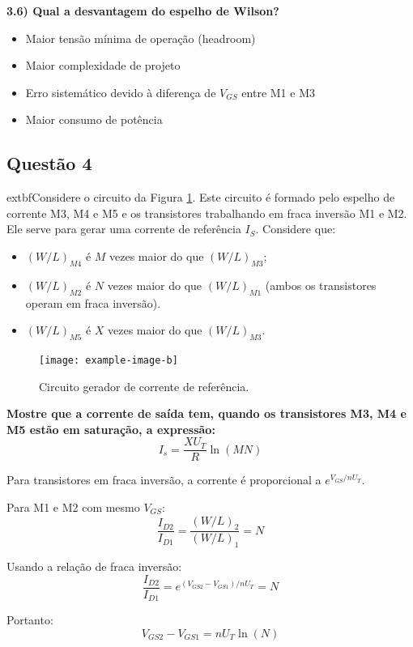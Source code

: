 ﻿\documentclass[12pt,a4paper]{article}
\begin{document}
\textbf{3.6) Qual a desvantagem do espelho de Wilson?}

\begin{itemize}
    \item Maior tensão mínima de operação (headroom)
    \item Maior complexidade de projeto
    \item Erro sistemático devido à diferença de $V_{GS}$ entre M1 e M3
    \item Maior consumo de potência
\end{itemize}

\subsection*{Questão 4}
    	extbf{Considere o circuito da Figura \ref{fig:gerador_corrente}. Este circuito é formado pelo espelho de corrente M3, M4 e M5 e os transistores trabalhando em fraca inversão M1 e M2. Ele serve para gerar uma corrente de referência $I_S$. Considere que:}
\begin{itemize}
    \item $(W/L)_{M4}$ é $M$ vezes maior do que $(W/L)_{M3}$;
    \item $(W/L)_{M2}$ é $N$ vezes maior do que $(W/L)_{M1}$ (ambos os transistores operam em fraca inversão).
    \item $(W/L)_{M5}$ é $X$ vezes maior do que $(W/L)_{M3}$.
\end{itemize}

\begin{figure}[H]
    \centering
    \texttt{[image: example-image-b]}
    \caption{Circuito gerador de corrente de referência.}
    \label{fig:gerador_corrente}
\end{figure}

\textbf{Mostre que a corrente de saída tem, quando os transistores M3, M4 e M5 estão em saturação, a expressão:}
$$I_s = \frac{XU_T}{R} \ln(MN)$$



Para transistores em fraca inversão, a corrente é proporcional a $e^{V_{GS}/nU_T}$. 

Para M1 e M2 com mesmo $V_{GS}$:
$$\frac{I_{D2}}{I_{D1}} = \frac{(W/L)_2}{(W/L)_1} = N$$

Usando a relação de fraca inversão:
$$\frac{I_{D2}}{I_{D1}} = e^{(V_{GS2} - V_{GS1})/nU_T} = N$$

Portanto:
$$V_{GS2} - V_{GS1} = nU_T \ln(N)$$
\end{document}

